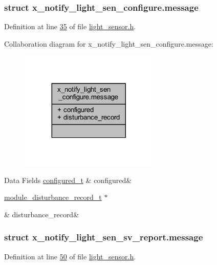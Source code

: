 \subsubsection{struct x\+\_\+notify\+\_\+light\+\_\+sen\+\_\+configure.\+message}


Definition at line \hyperlink{a00018_source_l00035}{35} of file \hyperlink{a00018_source}{light\+\_\+sensor.\+h}.



Collaboration diagram for x\+\_\+notify\+\_\+light\+\_\+sen\+\_\+configure.\+message\+:\nopagebreak
\begin{figure}[H]
\begin{center}
\leavevmode
\includegraphics[width=188pt]{dd/d20/a00939}
\end{center}
\end{figure}
\begin{DoxyFields}{Data Fields}
\hypertarget{a00018_a48e54afcf03ca45bfe38f6b7ff58764a}{\hyperlink{a00021_d6/d9c/a00352}{configured\+\_\+t}}\label{a00018_a48e54afcf03ca45bfe38f6b7ff58764a}
&
configured&
\\
\hline

\hypertarget{a00018_af7361f7710e5f5389134744aaa60254e}{\hyperlink{a00028}{module\+\_\+disturbance\+\_\+record\+\_\+t} $\ast$}\label{a00018_af7361f7710e5f5389134744aaa60254e}
&
disturbance\+\_\+record&
\\
\hline

\end{DoxyFields}
\label{dc/d8c/a00859}
\hypertarget{a00018_dc/d8c/a00859}{}
\subsubsection{struct x\+\_\+notify\+\_\+light\+\_\+sen\+\_\+sv\+\_\+report.\+message}


Definition at line \hyperlink{a00018_source_l00050}{50} of file \hyperlink{a00018_source}{light\+\_\+sensor.\+h}.



